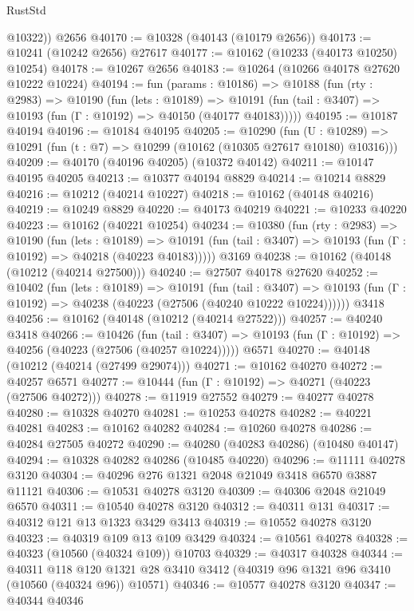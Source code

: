 \begin{lexlean}{RustStd}
\begin{coremodule}
        @10322))
    @2656
@40170 := @10328 (@40143 (@10179 @2656))
@40173 := @10241 (@10242 @2656) @27617
@40177 := @10162 (@10233 (@40173 @10250) @10254)
@40178 := @10267 @2656
@40183 := @10264 (@10266 @40178 @27620 @10222 @10224)
@40194 := fun (params : @10186) =>
  @10188
    (fun (rty : @2983) =>
    @10190
      (fun (lets : @10189) =>
      @10191 (fun (tail : @3407) => @10193 (fun (Γ : @10192) => @40150 (@40177 @40183)))))
@40195 := @10187 @40194
@40196 := @10184 @40195
@40205 := @10290
    (fun (U : @10289) => @10291 (fun (t : @7) => @10299 (@10162 (@10305 @27617 @10180) @10316)))
@40209 := @40170 (@40196 @40205) (@10372 @40142)
@40211 := @10147 @40195 @40205
@40213 := @10377 @40194 @8829
@40214 := @10214 @8829
@40216 := @10212 (@40214 @10227)
@40218 := @10162 (@40148 @40216)
@40219 := @10249 @8829
@40220 := @40173 @40219
@40221 := @10233 @40220
@40223 := @10162 (@40221 @10254)
@40234 := @10380
    (fun (rty : @2983) =>
    @10190
      (fun (lets : @10189) =>
      @10191 (fun (tail : @3407) => @10193 (fun (Γ : @10192) => @40218 (@40223 @40183)))))
    @3169
@40238 := @10162 (@40148 (@10212 (@40214 @27500)))
@40240 := @27507 @40178 @27620
@40252 := @10402
    (fun (lets : @10189) =>
    @10191
      (fun (tail : @3407) =>
      @10193 (fun (Γ : @10192) => @40238 (@40223 (@27506 (@40240 @10222 @10224))))))
    @3418
@40256 := @10162 (@40148 (@10212 (@40214 @27522)))
@40257 := @40240 @3418
@40266 := @10426
    (fun (tail : @3407) => @10193 (fun (Γ : @10192) => @40256 (@40223 (@27506 (@40257 @10224)))))
    @6571
@40270 := @40148 (@10212 (@40214 (@27499 @29074)))
@40271 := @10162 @40270
@40272 := @40257 @6571
@40277 := @10444 (fun (Γ : @10192) => @40271 (@40223 (@27506 @40272)))
@40278 := @11919 @27552
@40279 := @40277 @40278
@40280 := @10328 @40270
@40281 := @10253 @40278
@40282 := @40221 @40281
@40283 := @10162 @40282
@40284 := @10260 @40278
@40286 := @40284 @27505 @40272
@40290 := @40280 (@40283 @40286) (@10480 @40147)
@40294 := @10328 @40282 @40286 (@10485 @40220)
@40296 := @11111 @40278 @3120
@40304 := @40296 @276 @1321 @2048 @21049 @3418 @6570 @3887 @11121
@40306 := @10531 @40278 @3120
@40309 := @40306 @2048 @21049 @6570
@40311 := @10540 @40278 @3120
@40312 := @40311 @131
@40317 := @40312 @121 @13 @1323 @3429 @3413
@40319 := @10552 @40278 @3120
@40323 := @40319 @109 @13 @109 @3429
@40324 := @10561 @40278
@40328 := @40323 (@10560 (@40324 @109)) @10703
@40329 := @40317 @40328
@40344 := @40311
    @118
    @120
    @1321
    @28
    @3410
    @3412
    (@40319 @96 @1321 @96 @3410 (@10560 (@40324 @96)) @10571)
@40346 := @10577 @40278 @3120
@40347 := @40344 @40346

\end{coremodule}
\end{lexlean}
